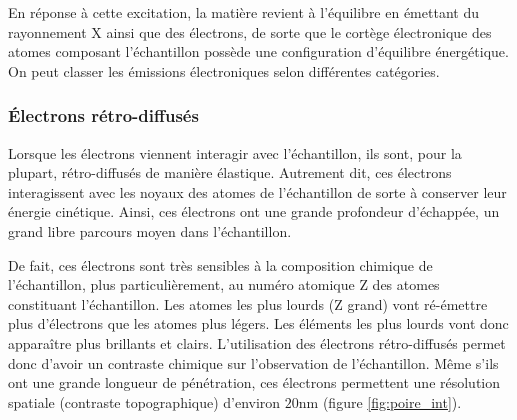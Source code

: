 \documentclass[a4paper,12pt]{article}
\begin{document}
En réponse à cette excitation, la matière revient à l'équilibre en émettant du rayonnement X ainsi que des électrons, 
de sorte que le cortège électronique des atomes composant l'échantillon possède une configuration d'équilibre énergétique. 
On peut classer les émissions électroniques selon différentes catégories.

\subsubsection*{Électrons rétro-diffusés}
Lorsque les électrons viennent interagir avec l'échantillon, ils sont, pour la plupart, rétro-diffusés de manière élastique.
Autrement dit, ces électrons interagissent avec les noyaux des atomes de l'échantillon de sorte à conserver leur énergie cinétique.
Ainsi, ces électrons ont une grande profondeur d'échappée, un grand libre parcours moyen dans l'échantillon.

De fait, ces électrons sont très sensibles à la composition chimique de l'échantillon, plus particulièrement, 
au numéro atomique Z des atomes constituant l'échantillon.
Les atomes les plus lourds (Z grand) vont ré-émettre plus d'électrons que les atomes plus légers.
Les éléments les plus lourds vont donc apparaître plus brillants et clairs. L'utilisation des électrons rétro-diffusés permet donc d'avoir un contraste chimique sur l'observation de l'échantillon.
Même s'ils ont une grande longueur de pénétration, ces électrons permettent une résolution spatiale (contraste topographique) d'environ $20$nm (figure \ref{fig:poire_int}).
\end{document}
